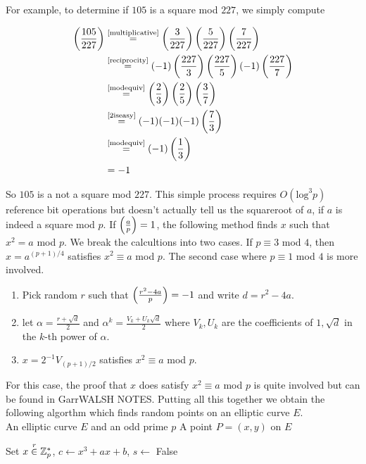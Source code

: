 For example, to determine if $105$ is a square mod $227$, we simply compute 

\begin{align*}
	\left(\frac{105}{227}\right) &\stackrel{\text{\eqref{multiplicative}}}{=} \left(\frac{3}{227}\right)\left(\frac{5}{227}\right)\left(\frac{7}{227}\right) \\
	&\stackrel{\text{\eqref{reciprocity}}}{=} (-1) \left(\frac{227}{3}\right)\left(\frac{227}{5}\right) (-1) \left(\frac{227}{7}\right) \\
	&\stackrel{\text{\eqref{modequiv}}}{=} \left(\frac{2}{3}\right)\left(\frac{2}{5}\right)\left(\frac{3}{7}\right) \\
	&\stackrel{\text{\eqref{2iseasy}}}{=} (-1)(-1)(-1) \left(\frac{7}{3}\right) \\
	&\stackrel{\text{\eqref{modequiv}}}{=} (-1) \left(\frac{1}{3}\right) \\
	&= -1 
\end{align*}

So $105$ is a not a square mod $227$. This simple process requires $O(\text{log}^3p)$ {\color{red}  reference } bit operations but doesn't actually tell us the squareroot of $a$, if $a$ is indeed a square mod $p$. If $\left(\frac{a}{p}\right) = 1 $, the following method finds $x$ such that $x^2 = a$ mod $p$. We break the calcultions into two cases. If $p \equiv 3 $ mod $4$, then $x = a^{(p+1)/4}$ satisfies $x^2 \equiv a $ mod $p$. The second case where $p \equiv 1 $ mod $4$ is more involved.

\begin{enumerate}[1.]
	\item Pick random $r$ such that $\left(\frac{r^2 - 4a}{p}\right) =  -1 $ and write $d = r^2 - 4a$.
	\item let $\alpha = \frac{r+\sqrt{d}}{2}$ and $\alpha^k = \frac{V_k + U_k \sqrt{d}}{2}$ where $V_k,U_k$ are the coefficients of $1, \sqrt{d}$ in the $k$-th power of $\alpha$. 
	\item $x =  2^{-1}V_{(p+1)/2}$ satisfies $x^2 \equiv a $ mod $p$. 
\end{enumerate}

For this case, the proof that $x$ does satisfy $x^2 \equiv a $ mod $p$ is quite involved but can be found in {\color{red} GarrWALSH NOTES}. Putting all this together we obtain the following algorthm which finds random points on an elliptic curve $E$. \\ 

	{An elliptic curve $E$ and an odd prime $p$}
	{A point $P=(x,y)$ on $E$}
	{
	\item Set $ x  \stackrel{r}{\in} \mathbb{Z}_p^* $, $c \leftarrow x^3 + ax + b$, $s \leftarrow$ False \\
	\item 
}


